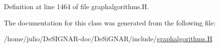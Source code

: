 Definition at line 1464 of file graphalgorithms.\+H.



The documentation for this class was generated from the following file\+:\begin{DoxyCompactItemize}
\item 
/home/julio/\+De\+S\+I\+G\+N\+A\+R-\/doc/\+De\+Si\+G\+N\+A\+R/include/\hyperlink{graphalgorithms_8_h}{graphalgorithms.\+H}\end{DoxyCompactItemize}
